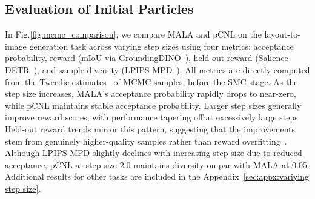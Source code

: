 \subsection{Evaluation of Initial Particles}
\label{sec:experiments:ealuation of initial particles}
\vspace{-0.1cm}
In Fig.\ref{fig:mcmc_comparison}, we compare MALA and pCNL on the layout-to-image generation task across varying step sizes using four metrics: acceptance probability, reward (mIoU via GroundingDINO~\cite{liu2023grounding}), held-out reward (Salience DETR~\cite{Hou2024saliencedetr}), and sample diversity (LPIPS MPD~\cite{zhang2018unreasonableLPIPS}). All metrics are directly computed from the Tweedie estimates~\cite{efron2011tweedie} of MCMC samples, before the SMC stage. 
As the step size increases, MALA's acceptance probability rapidly drops to near-zero, while pCNL maintains stable acceptance probability. Larger step sizes generally improve reward scores, with performance tapering off at excessively large steps. Held-out reward trends mirror this pattern, suggesting that the improvements stem from genuinely higher-quality samples rather than reward overfitting~\cite{uehara2024bridging, uehara2024finetuningcontinuoustimediffusionmodels}. 
Although LPIPS MPD slightly declines with increasing step size due to reduced acceptance, pCNL at step size 2.0 maintains diversity on par with MALA at 0.05. Additional results for other tasks are included in the Appendix~\ref{sec:appx:variying step size}.
